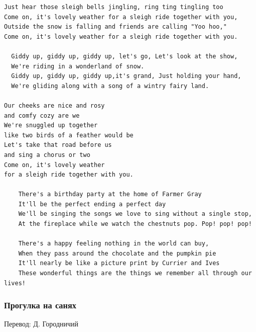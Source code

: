 \documentclass[
]{article}
\begin{document}
\begin{verbatim}
Just hear those sleigh bells jingling, ring ting tingling too
Come on, it's lovely weather for a sleigh ride together with you,
Outside the snow is falling and friends are calling "Yoo hoo,"
Come on, it's lovely weather for a sleigh ride together with you.

  Giddy up, giddy up, giddy up, let's go, Let's look at the show,
  We're riding in a wonderland of snow.
  Giddy up, giddy up, giddy up,it's grand, Just holding your hand,
  We're gliding along with a song of a wintry fairy land.

Our cheeks are nice and rosy
and comfy cozy are we
We're snuggled up together
like two birds of a feather would be
Let's take that road before us
and sing a chorus or two
Come on, it's lovely weather
for a sleigh ride together with you.

    There's a birthday party at the home of Farmer Gray
    It'll be the perfect ending a perfect day
    We'll be singing the songs we love to sing without a single stop,
    At the fireplace while we watch the chestnuts pop. Pop! pop! pop!
    
    There's a happy feeling nothing in the world can buy,
    When they pass around the chocolate and the pumpkin pie
    It'll nearly be like a picture print by Currier and Ives
    These wonderful things are the things we remember all through our lives!
\end{verbatim}

\hypertarget{ux43fux440ux43eux433ux443ux43bux43aux430-ux43dux430-ux441ux430ux43dux44fux445}{%
\subsubsection*{Прогулка на
санях}\label{ux43fux440ux43eux433ux443ux43bux43aux430-ux43dux430-ux441ux430ux43dux44fux445}}

Перевод: Д. Городничий
\end{document}
